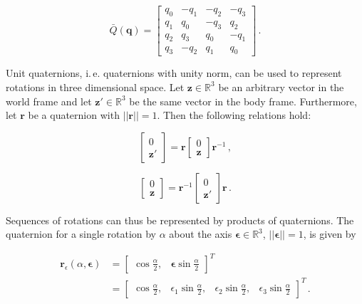 \begin{equation}
	\bar{Q}(\mathbf{q}) = \begin{bmatrix}
 q_0 & -q_1 & -q_2 & -q_3\\
 q_1 & q_0 & -q_3 & q_2\\
 q_2 & q_3 & q_0 & -q_1 \\
 q_3 & -q_2 & q_1 & q_0
\end{bmatrix}\,.
\end{equation}



Unit quaternions, i.\,e. quaternions with unity norm, can be used to represent rotations in three dimensional space. Let $\mathbf{z} \in \mathbb{R}^3$ be an arbitrary vector in the world frame and let $\mathbf{z}' \in \mathbb{R}^3$ be the same vector in the body frame. Furthermore, let $\mathbf{r}$ be a quaternion with $||\mathbf{r}|| = 1$. Then the following relations hold:

\begin{equation}
  \begin{bmatrix}
  	0 \\ \mathbf{z}' 
  \end{bmatrix} = \mathbf{r} \begin{bmatrix}
  	0 \\ \mathbf{z} 
  \end{bmatrix} \mathbf{r}^{-1}\,,
\end{equation}

\begin{equation}
  \begin{bmatrix}
  	0 \\ \mathbf{z} 
  \end{bmatrix} = \mathbf{r}^{-1} \begin{bmatrix}
  	0 \\ \mathbf{z}' 
  \end{bmatrix} \mathbf{r}\,.
\end{equation}

\noindent
Sequences of rotations can thus be represented by products of quaternions. The quaternion for a single rotation by $\alpha$ about the axis $\bm{\epsilon} \in \mathbb{R}^3$, $||\bm{\epsilon}|| = 1$, is given by

\begin{equation}
\begin{split}
  \mathbf{r}_{\epsilon}(\alpha, \bm{\epsilon}) &= \begin{bmatrix}
  	\cos \frac{\alpha}{2}, & \bm{\epsilon} \sin \frac{\alpha}{2}
  \end{bmatrix}^T \\
  &= \begin{bmatrix}
  	\cos \frac{\alpha}{2}, & \epsilon _1 \sin \frac{\alpha}{2}, & \epsilon _2 \sin \frac{\alpha}{2}, & \epsilon _3 \sin \frac{\alpha}{2}
  \end{bmatrix}^T\,.
\end{split}
\end{equation}

